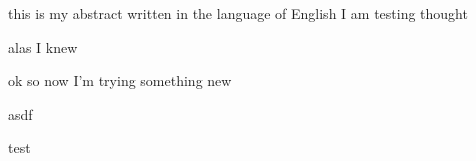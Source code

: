 this is my abstract written in the language of English I am testing thought

alas  I knew

ok so now I'm trying something new

asdf

test
